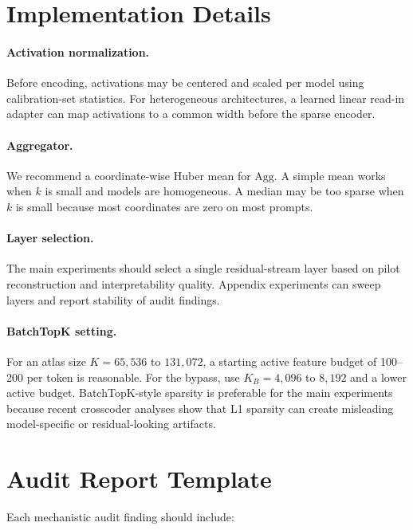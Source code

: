 \documentclass[11pt]{article}
\newcommand{\agg}{\mathrm{Agg}}
\begin{document}
\appendix

\section{Implementation Details}

\paragraph{Activation normalization.}
Before encoding, activations may be centered and scaled per model using calibration-set statistics. For heterogeneous architectures, a learned linear read-in adapter can map activations to a common width before the sparse encoder.

\paragraph{Aggregator.}
We recommend a coordinate-wise Huber mean for $\agg$. A simple mean works when $k$ is small and models are homogeneous. A median may be too sparse when $k$ is small because most coordinates are zero on most prompts.

\paragraph{Layer selection.}
The main experiments should select a single residual-stream layer based on pilot reconstruction and interpretability quality. Appendix experiments can sweep layers and report stability of audit findings.

\paragraph{BatchTopK setting.}
For an atlas size $K=65{,}536$ to $131{,}072$, a starting active feature budget of 100--200 per token is reasonable. For the bypass, use $K_B=4{,}096$ to $8{,}192$ and a lower active budget. BatchTopK-style sparsity is preferable for the main experiments because recent crosscoder analyses show that L1 sparsity can create misleading model-specific or residual-looking artifacts.

\section{Audit Report Template}

Each mechanistic audit finding should include:
\end{document}
